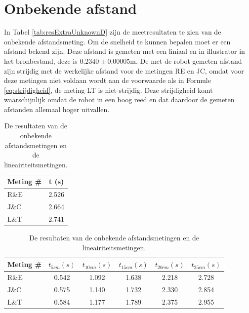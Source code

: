 \documentclass{report}
\begin{document}
\section{Onbekende afstand}

In Tabel \ref{tab:resExtraUnknownD} zijn de meetresultaten te zien van de onbekende afstandsmeting.
Om de snelheid te kunnen bepalen moet er een afstand bekend zijn. Deze afstand is gemeten met een liniaal en in illustrator in het bronbestand,
deze is $0.2340 \pm 0.00005\mathrm{m}$.
De met de robot gemeten afstand zijn strijdig met de werkelijke afstand voor de metingen RE en JC,
omdat voor deze metingen niet voldaan wordt aan de voorwaarde als in Formule \ref{eq:strijdigheid}, de meting LT is niet strijdig.
Deze strijdigheid komt waarschijnlijk omdat de robot in een boog reed en dat daardoor de gemeten afstanden allemaal hoger uitvallen.


\begin{table}
	\centering
	\caption{De resultaten van de onbekende afstandsmetingen en de lineairiteitsmetingen.}

	\begin{subtable}[b]{0.33\linewidth}
		\centering
		\label{tab:resExtraUnknownD}
		\begin{tabular}{| l| c|}
		\hline
		  Meting \#  & t (s)\\
		\hline
		  R\&E & 2.526 \\
		\hline
		J\&C & 2.664 \\
		\hline
		L\&T & 2.741 \\
		\hline
		 \end{tabular}
	\end{subtable}
	\begin{subtable}[b]{0.66\linewidth}
		\centering
		\label{tab:resExtraLin}
		\begin{tabular}{| l| c| c| c| c| c|}
		\hline
		  Meting \# & $t_{5cm} (s)$ & $t_{10cm} (s)$ & $t_{15cm} (s)$ & $t_{20cm} (s)$ & $t_{25cm} (s)$\\
		\hline
		  R\&E & 0.542 & 1.092 & 1.638 & 2.218 & 2.728 \\
		\hline
		J\&C & 0.575 & 1.140 & 1.732 & 2.330 & 2.854 \\
		\hline
		L\&T & 0.584 & 1.177 & 1.789 & 2.375 & 2.955 \\
		\hline
		 \end{tabular}
	\end{subtable}
\end{table}
\end{document}

